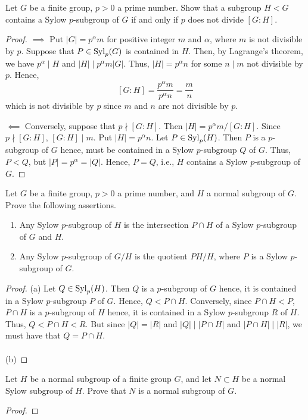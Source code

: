 \begin{problem}
Let $G$ be a finite group, $p>0$ a prime number. Show that a
subgroup $H<G$ contains a Sylow $p$-subgroup of $G$ if and only
if $p$ does not divide $[G:H]$.
\end{problem}
\begin{proof}
$\implies$ Put $|G|=p^\alpha m$ for positive integer $m$ and $\alpha$,
where $m$ is not divisible by $p$. Suppose that $P\in\operatorname{Syl}_p(G)$ is
contained in $H$. Then, by Lagrange's theorem, we have $p^\alpha\mid H$ and
$|H|\mid p^\alpha m|G|$. Thus, $|H|=p^\alpha n$ for some $n\mid m$ not
divisible by $p$. Hence,
\[
[G:H]=\frac{p^\alpha m}{p^\alpha n}=\frac{m}{n}
\]
which is not divisible by $p$ since $m$ and $n$ are not divisible by $p$.

$\impliedby$ Conversely, suppose that $p\nmid [G:H]$. Then $|H|=p^\alpha
m/[G:H]$. Since $p\nmid [G:H]$, $[G:H]\mid m$. Put $|H|=p^\alpha n$. Let
$P\in\operatorname{Syl}_p(H)$. Then $P$ is a $p$-subgroup of $G$ hence, must be contained
in a Sylow $p$-subgroup $Q$ of $G$. Thus, $P<Q$, but
$|P|=p^\alpha=|Q|$. Hence, $P=Q$, i.e., $H$ contains a Sylow $p$-subgroup
of $G$.
\end{proof}

\begin{problem}
Let $G$ be a finite group, $p>0$ a prime number, and $H$ a
normal subgroup of $G$. Prove the following assertions.
\begin{enumerate}[label=(\alph*)]
\item Any Sylow $p$-subgroup of $H$ is the intersection
$P\cap H$ of a Sylow $p$-subgroup of $G$ and $H$.
\item Any Sylow $p$-subgroup of $G/H$ is the quotient $PH/H$,
where $P$ is a Sylow $p$-subgroup of $G$.
\end{enumerate}
\end{problem}
\begin{proof}
(a) Let $Q\in\operatorname{Syl}_p(H)$. Then $Q$ is a $p$-subgroup of $G$ hence, it is
contained in a Sylow $p$-subgroup $P$ of $G$. Hence, $Q<P\cap
H$. Conversely, since $P\cap H<P$, $P\cap H$ is a $p$-subgroup of $H$
hence, it is contained in a Sylow $p$-subgroup $R$ of $H$. Thus, $Q<P\cap
H<R$. But since $|Q|=|R|$ and $|Q|\mid |P\cap H|$ and $|P\cap H|\mid |R|$,
we must have that $Q=P\cap H$.
\\\\
(b)
\end{proof}

\begin{problem}
Let $H$ be a normal subgroup of a finite group $G$, and let
$N\subset H$ be a normal Sylow subgroup of $H$. Prove that $N$
is a normal subgroup of $G$.
\end{problem}
\begin{proof}
\end{proof}

